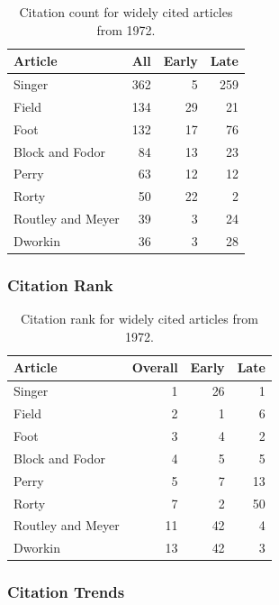 \documentclass[
  10pt,
  letterpaper,
  DIV=11,
  numbers=noendperiod,
  twoside]{scrartcl}
\begin{document}
\begin{longtable}[]{@{}lrrr@{}}

\caption{\label{tbl-citation-count-1972}Citation count for widely cited
articles from 1972.}

\tabularnewline

\toprule\noalign{}
Article & All & Early & Late \\
\midrule\noalign{}
\endhead
\bottomrule\noalign{}
\endlastfoot
Singer & 362 & 5 & 259 \\
Field & 134 & 29 & 21 \\
Foot & 132 & 17 & 76 \\
Block and Fodor & 84 & 13 & 23 \\
Perry & 63 & 12 & 12 \\
Rorty & 50 & 22 & 2 \\
Routley and Meyer & 39 & 3 & 24 \\
Dworkin & 36 & 3 & 28 \\

\end{longtable}

\subsubsection*{Citation Rank}\label{sec-rank-1972}

\begin{longtable}[]{@{}lrrr@{}}

\caption{\label{tbl-citation-rank-1972}Citation rank for widely cited
articles from 1972.}

\tabularnewline

\toprule\noalign{}
Article & Overall & Early & Late \\
\midrule\noalign{}
\endhead
\bottomrule\noalign{}
\endlastfoot
Singer & 1 & 26 & 1 \\
Field & 2 & 1 & 6 \\
Foot & 3 & 4 & 2 \\
Block and Fodor & 4 & 5 & 5 \\
Perry & 5 & 7 & 13 \\
Rorty & 7 & 2 & 50 \\
Routley and Meyer & 11 & 42 & 4 \\
Dworkin & 13 & 42 & 3 \\

\end{longtable}

\subsubsection*{Citation Trends}\label{sec-trends-1972}
\end{document}
